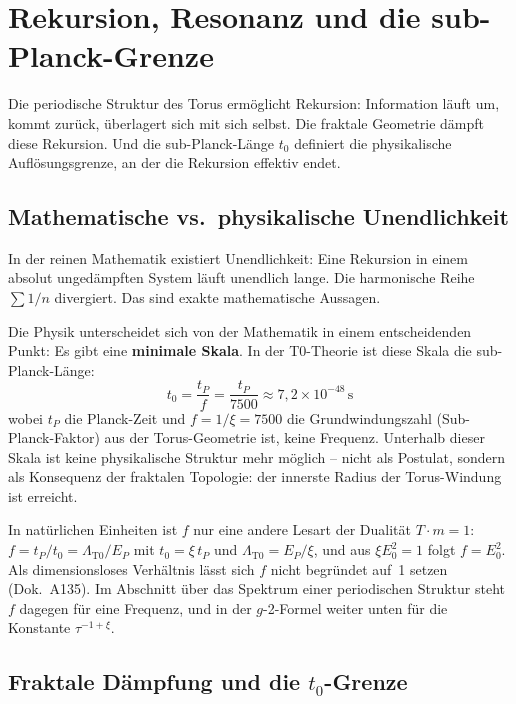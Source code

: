 	
	\section{Rekursion, Resonanz und die sub-Planck-Grenze}
	
	Die periodische Struktur des Torus ermöglicht Rekursion: Information läuft um, kommt zurück, überlagert sich mit sich selbst. Die fraktale Geometrie dämpft diese Rekursion. Und die sub-Planck-Länge $t_0$ definiert die physikalische Auflösungsgrenze, an der die Rekursion effektiv endet.
	
	\subsection{Mathematische vs.\ physikalische Unendlichkeit}
	
	In der reinen Mathematik existiert Unendlichkeit: Eine Rekursion in einem absolut ungedämpften System läuft unendlich lange. Die harmonische Reihe $\sum 1/n$ divergiert. Das sind exakte mathematische Aussagen.
	
	Die Physik unterscheidet sich von der Mathematik in einem entscheidenden Punkt: Es gibt eine \textbf{minimale Skala}. In der T0-Theorie ist diese Skala die sub-Planck-Länge:
	\begin{equation}
		t_0 = \frac{t_P}{f} = \frac{t_P}{7500} \approx 7{,}2 \times 10^{-48} \, \text{s}
	\end{equation}
	wobei $t_P$ die Planck-Zeit und $f = 1/\xi = 7500$ die Grundwindungszahl (Sub-Planck-Faktor) aus der Torus-Geometrie ist, keine Frequenz. Unterhalb dieser Skala ist keine physikalische Struktur mehr möglich -- nicht als Postulat, sondern als Konsequenz der fraktalen Topologie: der innerste Radius der Torus-Windung ist erreicht.

In natürlichen Einheiten ist $f$ nur eine andere Lesart der Dualität $T\cdot m = 1$: $f = t_P/t_0 = \Lambda_{\text{T0}}/E_P$ mit $t_0 = \xi\,t_P$ und $\Lambda_{\text{T0}} = E_P/\xi$, und aus $\xi E_0^2 = 1$ folgt $f = E_0^2$. Als dimensionsloses Verhältnis lässt sich $f$ nicht begründet auf~1 setzen (Dok.~A135). Im Abschnitt über das Spektrum einer periodischen Struktur steht $f$ dagegen für eine Frequenz, und in der $g$-2-Formel weiter unten für die Konstante $\tau^{-1+\xi}$.

	\subsection{Fraktale Dämpfung und die $t_0$-Grenze}
	
